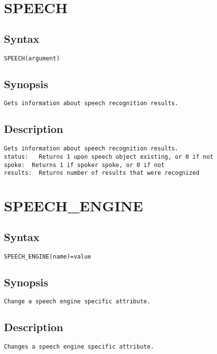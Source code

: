 \section{SPEECH}
\subsection{Syntax}
\begin{verbatim}
SPEECH(argument)
\end{verbatim}
\subsection{Synopsis}
\begin{verbatim}
Gets information about speech recognition results.
\end{verbatim}
\subsection{Description}
\begin{verbatim}
Gets information about speech recognition results.
status:   Returns 1 upon speech object existing, or 0 if not
spoke:  Returns 1 if spoker spoke, or 0 if not
results:  Returns number of results that were recognized

\end{verbatim}


\section{SPEECH\_ENGINE}
\subsection{Syntax}
\begin{verbatim}
SPEECH_ENGINE(name)=value
\end{verbatim}
\subsection{Synopsis}
\begin{verbatim}
Change a speech engine specific attribute.
\end{verbatim}
\subsection{Description}
\begin{verbatim}
Changes a speech engine specific attribute.

\end{verbatim}


